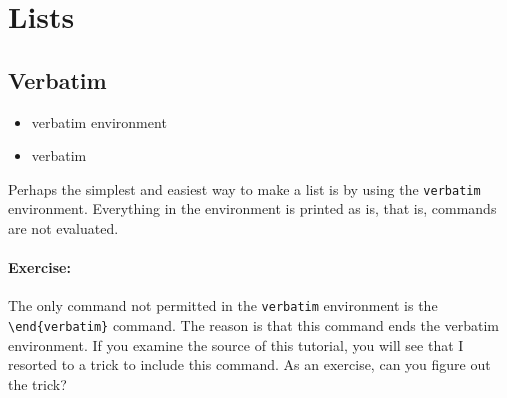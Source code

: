 	
	\section{Lists}
	\label{Lists}

        \subsection{Verbatim}
        \label{Verbatim}
        
        \begin{framed}
            \begin{itemize}
                \item{verbatim environment}
                \item{verbatim}
            \end{itemize}
        \end{framed}

    Perhaps the simplest and easiest way to make a list is by using the \texttt{verbatim} environment. Everything in the environment is printed as is, that is, \Lx{} commands are not evaluated.


        \paragraph{Exercise:} The only command not permitted in the \texttt{verbatim} environment is the \texttt{\textbackslash{}end\{verbatim\}} command. The reason is that this command ends the verbatim environment. If you examine the source of this tutorial, you will see that I resorted to a trick to include this command. As an exercise, can you figure out the trick?

